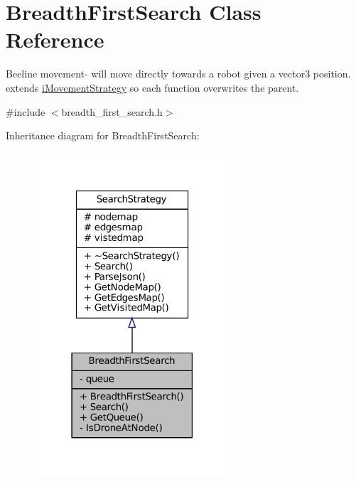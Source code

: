\hypertarget{classBreadthFirstSearch}{}\section{Breadth\+First\+Search Class Reference}
\label{classBreadthFirstSearch}


Beeline movement-\/ will move directly towards a robot given a vector3 position. extends \hyperlink{classiMovementStrategy}{i\+Movement\+Strategy} so each function overwrites the parent.  




{\ttfamily \#include $<$breadth\+\_\+first\+\_\+search.\+h$>$}



Inheritance diagram for Breadth\+First\+Search\+:\nopagebreak
\begin{figure}[H]
\begin{center}
\leavevmode
\includegraphics[width=207pt]{classBreadthFirstSearch__inherit__graph}
\end{center}
\end{figure}


